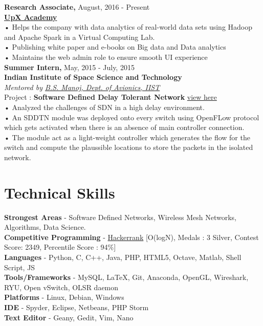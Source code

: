 \documentclass{resume}
\begin{document}
\begin{multicols}{2}
\noindent \textbf{Research Associate,} \hfill August, 2016 - Present\\
\href{http://upxacademy.com}{\textbf{UpX Academy}}\\
• Helps the company with data analytics of real-world data sets using Hadoop and Apache Spark in a Virtual Computing Lab.\\
• Publishing white paper and e-books on Big data and Data analytics\\
• Maintains the web admin role to ensure smooth UI experience \\

\noindent \textbf{Summer Intern,} \hfill May, 2015 - July, 2015\\
\textbf{Indian Institute of Space Science and Technology}\\
\emph{Mentored by \href{https://www.iist.ac.in/avionics/bsmanoj}{B.S. Manoj, Dept. of Avionics, IIST}}\\
Project : \textbf{Software Defined Delay Tolerant Network} \href{https://drive.google.com/open?id=0B7qfuVtugGPOZ2FURXNfaXlELXc}{view here}\\
• Analyzed the challenges of SDN in a high delay environment.\\ 
• An SDDTN module was deployed onto every switch using OpenFLow protocol which gets activated when there is an absence of main controller connection. \\
• The module act as a light-weight controller which generates the flow for the switch and compute the plaussible locations to store the packets in the isolated network. \\


\section{Technical Skills}

\textbf{Strongest Areas} - Software Defined Networks, Wireless Mesh Networks, Algorithms, Data Science.\\[.05in]
\textbf{Competitive Programming} - \href{https://www.hackerrank.com/amalrkrishna94}{Hackerrank} [O(logN), Medals : 3 Silver, Contest Score: 2349, Percentile Score : 94\%]\\[.05in]
\textbf{Languages} - Python, C, C++, Java, PHP, HTML5, Octave, Matlab, Shell Script, JS\\[.05in]
\textbf{Tools/Frameworks} - MySQL, \LaTeX, Git, Anaconda, OpenGL, Wireshark, RYU, Open vSwitch, OLSR daemon\\[.05in]
\textbf{Platforms} - Linux, Debian, Windows \\[.05in]
\textbf{IDE} - Spyder, Eclipse, Netbeans, PHP Storm\\[.05in]
\textbf{Text Editor} - Geany, Gedit, Vim, Nano\\[.05in]


\end{multicols}
\end{document}

